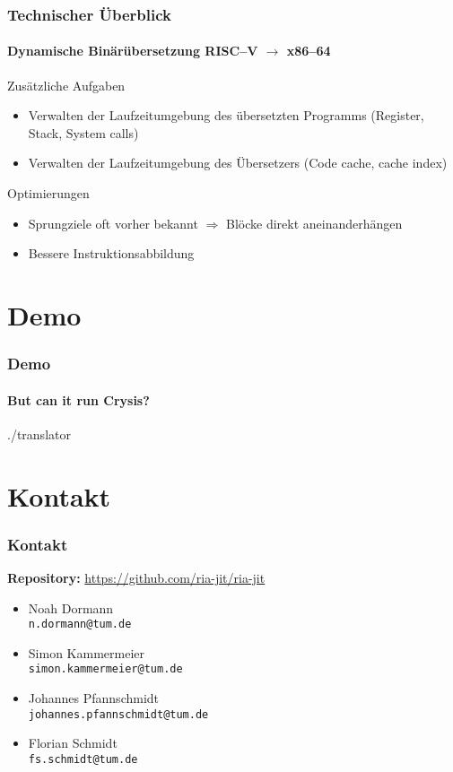 \documentclass[aspectratio=169, sectionpage=false, german]{tumbeamer}
\newcommand{\blueverb}[1]{{\color{TUMBlue} \texttt{#1}}}
\newcommand{\conclude}[0]{\ensuremath{\Longrightarrow} }
\newcommand{\refer}[0]{\ensuremath{\rightarrow} }
\begin{document}
\begin{frame}
	\frametitle{Technischer Überblick}

	\framesubtitle {Dynamische Binärübersetzung RISC--V \refer x86--64}

	\begin{block}{Zusätzliche Aufgaben}
		\begin{itemize}
			\item Verwalten der Laufzeitumgebung des übersetzten Programms (Register, Stack, System calls)
			\item Verwalten der Laufzeitumgebung des Übersetzers (Code cache, cache index)
		\end{itemize}
	\end{block}
	\vspace{0.75cm}

	\begin{block}{Optimierungen}
		\begin{itemize}
			\item Sprungziele oft vorher bekannt \conclude Blöcke direkt aneinanderhängen
			\item Bessere Instruktionsabbildung
		\end{itemize}
	\end{block}
\end{frame}

\section{Demo}
\begin{frame}[c]
	\frametitle{Demo}
	\framesubtitle{But can it run Crysis?}
	\centering\Huge\ttfamily
	./translator
\end{frame}


\section{Kontakt}
\begin{frame}[c]
	\frametitle{Kontakt}
	\textbf{Repository:}\hspace{0.25cm} {\color{TUMBlue}\url{https://github.com/ria-jit/ria-jit}}
	
	\vspace{0.75cm}
	
	\begin{itemize}
		\item Noah Dormann\\\blueverb{n.dormann@tum.de}
		\item Simon Kammermeier\\\blueverb{simon.kammermeier@tum.de}
		\item Johannes Pfannschmidt\\\blueverb{johannes.pfannschmidt@tum.de}
		\item Florian Schmidt\\\blueverb{fs.schmidt@tum.de}
	\end{itemize}
\end{frame}
\end{document}
